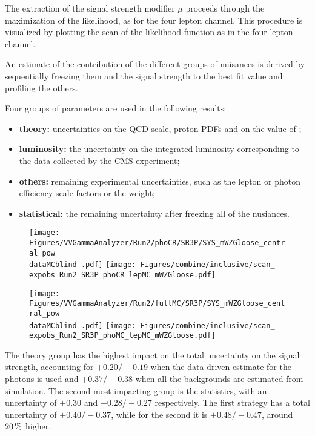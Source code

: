 The extraction of the signal strength modifier $\mu$ proceeds through the maximization of the likelihood,
as for the four lepton channel.
This procedure is visualized by plotting the scan of the likelihood function as in the four lepton channel.

An estimate of the contribution of the different groups of nuisances is derived
by sequentially freezing them and the signal strength to the best fit value
and profiling the others.

Four groups of parameters are used in the following results:
\begin{itemize}
\item \textbf{theory:} uncertainties on the QCD scale, proton PDFs and on the value of \alpS;
\item \textbf{luminosity:} the uncertainty on the integrated luminosity corresponding to the data collected by the CMS experiment;
\item \textbf{others:} remaining experimental uncertainties, such as the lepton or photon efficiency scale factors or the \pileup{} weight;
\item \textbf{statistical:} the remaining uncertainty after freezing all of the nusiances.
\end{itemize}

\begin{figure}
  \centering
  \texttt{[image: Figures/VVGammaAnalyzer/Run2/phoCR/SR3P/SYS\_mWZGloose\_central\_pow\\dataMCblind .pdf]}
  \texttt{[image: Figures/combine/inclusive/scan\_\\expobs\_Run2\_SR3P\_phoCR\_lepMC\_mWZGloose.pdf]}
  \caption{}
  \label{fig:scan_Run2_SR3P_phoCR_lepMC_mWZGloose}
\end{figure}

\begin{figure}
  \centering
  \texttt{[image: Figures/VVGammaAnalyzer/Run2/fullMC/SR3P/SYS\_mWZGloose\_central\_pow\\dataMCblind .pdf]}
  \texttt{[image: Figures/combine/inclusive/scan\_\\expobs\_Run2\_SR3P\_phoMC\_lepMC\_mWZGloose.pdf]}
  \caption{}
  \label{fig:scan_Run2_SR4P_phoMC_lepMC_mWZGloose}
\end{figure}

The theory group has the highest impact on the total uncertainty on the signal strength,
accounting for ${+}0.20/{-}0.19$ when the data-driven estimate for the \nonprompt photons is used
and ${+}0.37/{-}0.38$ when all the backgrounds are estimated from simulation.
The second most impacting group is the statistics, with an uncertainty of
$\pm 0.30$ and ${+}0.28/{-}0.27$ respectively.
The first strategy has a total uncertainty of ${+}0.40/{-}0.37$,
while for the second it is ${+}0.48/{-}0.47$,
around $20\usep\%$ higher.
